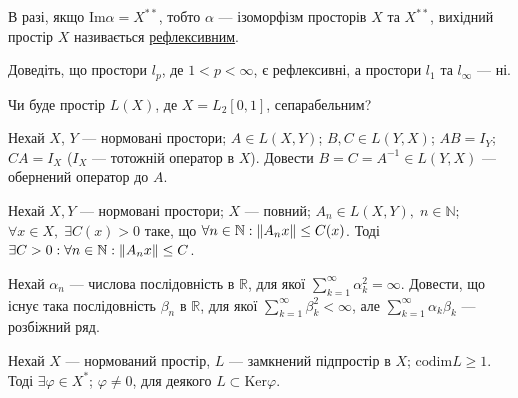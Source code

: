 \begin{theory}
    В разі, якщо $\mathrm{Im}\alpha = X^{**}$, тобто $\alpha$ --- ізоморфізм просторів $X$ та $X^{**}$,
    вихідний простір $X$ називається \underline{рефлексивним}.
\end{theory}

\begin{exercise}
    Доведіть, що простори  $l_p$, де $1<p<\infty$, є рефлексивні, а простори $l_1$ та $l_\infty$ --- ні.
\end{exercise}

\begin{exercise}
    Чи буде простір $L(X)$, де $X=L_2[0,1]$, сепарабельним?
\end{exercise}

\begin{exercise}
    Нехай $X$, $Y$ --- нормовані простори; $A \in L\left( X, Y\right)$; $B, C \in L\left( Y, X\right)$;
    $AB = I_Y$; $CA = I_X$ ($I_X$ --- тотожній оператор в $X$).
    Довести $B = C = A^{-1} \in L\left( Y, X\right)$ --- обернений оператор до $A$.
\end{exercise}

\begin{theory}
    \begin{theorem*}
        Нехай $X, Y$ --- нормовані простори; $X$ --- повний; $A_n \in L\left( X, Y\right),\; n\in \mathbb{N}$;
        $\forall x \in X, \; \exists C(x) > 0$ таке, що $\forall n \in \mathbb{N}: \left\lVert A_n x\right\rVert \leq C(x)$.
        Тоді $\exists C>0: \forall n \in \mathbb{N}: \left\lVert A_n x\right\rVert \leq C$.
    \end{theorem*}
\end{theory}

\begin{exercise}
    Нехай $\alpha_n$ --- числова послідовність в $\mathbb{R}$, для якої 
    $\sum^\infty_{k=1} \alpha^2_k =\infty$. Довести, що існує така послідовність 
    $\beta_n$ в $\mathbb{R}$, для якої $\sum^\infty_{k=1} \beta^2_k < \infty$, 
    але $\sum^\infty_{k=1} \alpha_k\beta_k$ --- розбіжний ряд.
\end{exercise}

\begin{exercise}
    Нехай $X$ --- нормований простір, $L$ --- замкнений підпростір в $X$; $\mathrm{codim}L \geq 1$.
    Тоді $\exists \varphi \in X^*$; $\varphi \neq 0$, для деякого $L \subset \mathrm{Ker}\varphi$.
\end{exercise}

